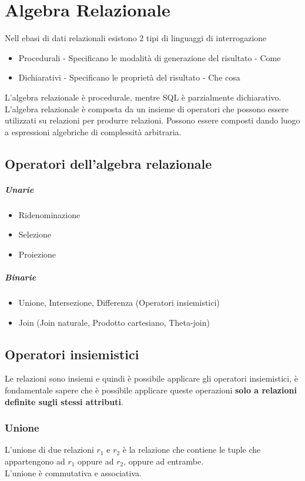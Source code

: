 \chapter{Algebra Relazionale}
Nell ebasi di dati relazionali esistono 2 tipi di linguaggi di interrogazione
\begin{itemize}
    \item Procedurali - Specificano le modalità di generazione del risultato - Come
    \item Dichiarativi - Specificano le proprietà del risultato - Che cosa
\end{itemize}
L'algebra relazionale è procedurale, mentre SQL è parzialmente dichiarativo.\\
L'algebra relazionale è composta da un insieme di operatori che possono essere
utilizzati su relazioni per produrre relazioni. Possono essere composti dando
luogo a espressioni algebriche di complessità arbitraria.\\
\section{Operatori dell'algebra relazionale}
\paragraph*{Unarie}
\begin{itemize}
    \item Ridenominazione
    \item Selezione
    \item Proiezione
\end{itemize}
\paragraph*{Binarie}
\begin{itemize}
    \item Unione, Intersezione, Differenza (Operatori insiemistici)
    \item Join (Join naturale, Prodotto cartesiano, Theta-join)
\end{itemize}
\section{Operatori insiemistici}
Le relazioni sono insiemi e quindi è possibile applicare gli operatori insiemistici,
è fondamentale sapere che è possibile applicare queste operazioni \textbf{solo a relazioni
    definite sugli stessi attributi}.
\subsection*{Unione}
L'unione di due relazioni $r_1$ e $r_2$ è la relazione che contiene le tuple
che appartengono ad $r_1$ oppure ad $r_2$, oppure ad entrambe.\\
L'unione è commutativa e associativa.
